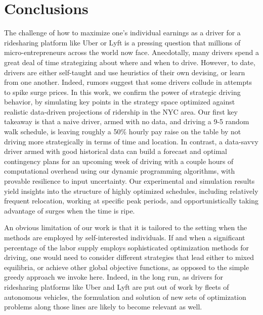 
\section{Conclusions}
\label{sec:conclusions}

The challenge of how to maximize one's individual earnings as a driver for a 
ridesharing platform like Uber or Lyft is a pressing question that millions of micro-entrepreneurs 
across the world now face.  Anecdotally, many drivers spend a great deal of time 
strategizing about where and when to drive.  However, to date, drivers are either
self-taught and use heuristics of their own devising, or learn from one another.
Indeed, rumors suggest that some drivers collude in attempts to spike surge prices.
In this work, we confirm the power of strategic driving behavior, by simulating 
key points in the strategy space optimized against realistic data-driven projections
of ridership in the NYC area.  Our first key takeaway is that a naive driver,
armed with no data, and driving a 9-5 random walk schedule, is leaving 
roughly a 50\% hourly pay raise on the table by not driving more strategically 
in terms of time and location.  In contrast, a data-savvy driver armed with
good historical data can build a forecast and optimal contingency plans for 
an upcoming week of driving with a couple hours of computational overhead using 
our dynamic programming algorithms, with provable resilience to input
uncertainty.  Our experimental and simulation results yield insights into the
structure of highly optimized schedules, including relatively frequent relocation,
working at specific peak periods, and opportunistically taking advantage of 
surges when the time is ripe.  

An obvious limitation of our work is that it is tailored to the setting when the 
methods are employed by self-interested individuals.  If and when a 
significant percentage of the labor supply employs sophisticated optimization methods
for driving, one would need to consider different strategies that lead either to mixed 
equilibria, or achieve other global objective functions, as opposed to the simple 
greedy approach we invoke here.  Indeed, in the long run, as drivers for ridesharing 
platforms like Uber and Lyft are put out of work by fleets of autonomous vehicles, 
the formulation and solution of new sets of optimization problems along those lines
are likely to become relevant as well.



